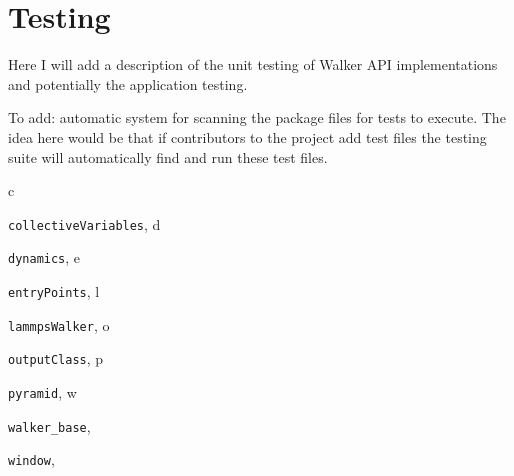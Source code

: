 \documentclass[letterpaper,10pt,english]{sphinxmanual}
\begin{document}
\chapter{Testing}
\label{test/testing.doc:testing}\label{test/testing.doc::doc}
Here I will add a description of the unit testing of Walker API implementations and potentially the application testing.

To add: automatic system for scanning the package files for tests to execute. The idea here would be that if contributors to the project add test files the testing suite will automatically find and run these test files.


\renewcommand{\indexname}{Python Module Index}
\begin{theindex}
\def\bigletter#1{{\Large\sffamily#1}\nopagebreak\vspace{1mm}}
\bigletter{c}
\item {\texttt{collectiveVariables}}, \pageref{walker_api/walker_api.doc:module-collectiveVariables}
\indexspace
\bigletter{d}
\item {\texttt{dynamics}}, \pageref{walker_api/walker_api.doc:module-dynamics}
\indexspace
\bigletter{e}
\item {\texttt{entryPoints}}, \pageref{applications/applications.doc:module-entryPoints}
\indexspace
\bigletter{l}
\item {\texttt{lammpsWalker}}, \pageref{walker_api/walker_api.doc:module-lammpsWalker}
\indexspace
\bigletter{o}
\item {\texttt{outputClass}}, \pageref{walker_api/walker_api.doc:module-outputClass}
\indexspace
\bigletter{p}
\item {\texttt{pyramid}}, \pageref{applications/applications.doc:module-pyramid}
\indexspace
\bigletter{w}
\item {\texttt{walker\_base}}, \pageref{walker_api/walker_api.doc:module-walker_base}
\item {\texttt{window}}, \pageref{applications/applications.doc:module-window}
\end{theindex}

\renewcommand{\indexname}{Index}
\printindex
\end{document}
